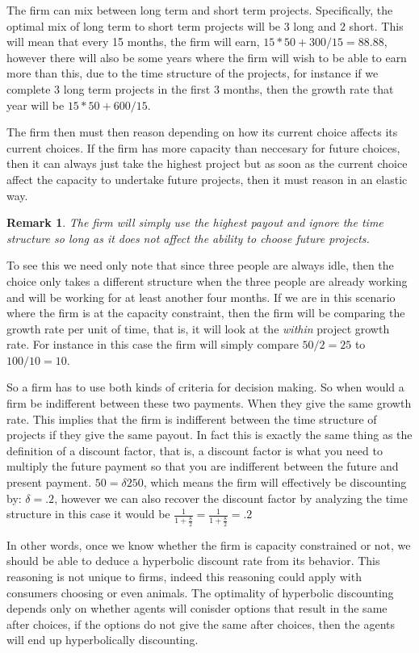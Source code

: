 \documentclass[12pt]{report}
\newtheorem{remark}{Remark}
\numberwithin{equation}{section}
\begin{document}
The firm can mix between long term and short term projects. Specifically, the optimal mix of long term to short term projects will be $3$ long and $2$ short. This will mean that every 15 months, the firm will earn, $15*50+300/15=88.88$, however there will also be some years where the firm will wish to be able to earn more than this, due to the time structure of the projects, for instance if we complete 3 long term projects in the first 3 months, then the growth rate that year will be $15*50+600/15$. 

The firm then must then reason depending on how its current choice affects its current choices. If the firm has more capacity than neccesary for future choices, then it can always just take the highest project but as soon as the current choice affect the capacity to undertake future projects, then it must reason in an elastic way. 

\begin{remark}
The firm will simply use the highest payout and ignore the time structure so long as it does not affect the ability to choose future projects. 
\end{remark}

To see this we need only note that since three people are always idle, then the choice only takes a different structure when the three people are already working and will be working for at least another four months. If we are in this scenario where the firm is at the capacity constraint, then the firm will be comparing the growth rate per unit of time, that is, it will look at the \textit{within} project growth rate. For instance in this case the firm will simply compare $50/2=25$ to $100/10=10$. 

So a firm has to use both kinds of criteria for decision making. So when would a firm be indifferent between these two payments. When they give the same growth rate. This implies that the firm is indifferent between the time structure of projects if they give the same payout. In fact this is exactly the same thing as the definition of a discount factor, that is, a discount factor is what you need to multiply the future payment so that you are indifferent between the future and present payment. $50= \delta 250$, which means the firm will effectively be discounting by: $\delta = .2$, however we can also recover the discount factor by analyzing the time structure in this case it would be $\frac{1}{1+\frac{8}{2}}=\frac{1}{1+\frac{8}{2}}=.2$

In other words, once we know whether the firm is capacity constrained or not, we should be able to deduce a hyperbolic discount rate from its behavior. This reasoning is not unique to firms, indeed this reasoning could apply with consumers choosing or even animals. The optimality of hyperbolic discounting depends only on whether agents will conisder options that result in the same after choices, if the options do not give the same after choices, then the agents will end up hyperbolically discounting. 
\end{document}
